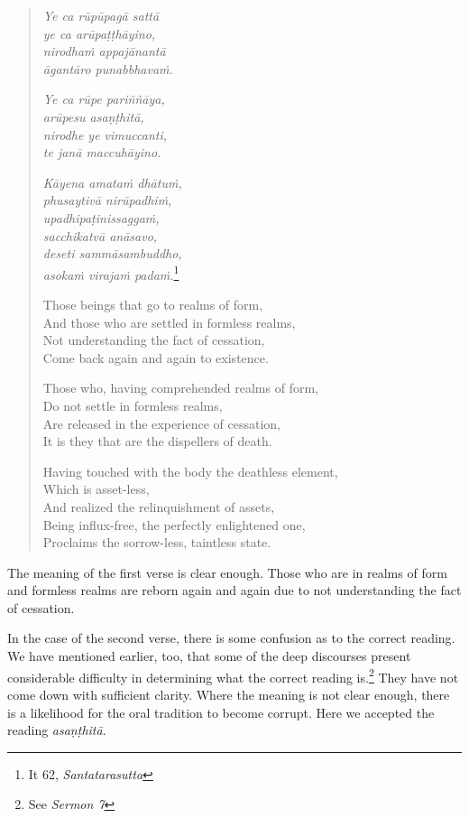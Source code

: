 \begin{quote}
\emph{Ye ca rūpūpagā sattā}\\
\emph{ye ca arūpaṭṭhāyino,}\\
\emph{nirodhaṁ appajānantā}\\
\emph{āgantāro punabbhavaṁ.}

\emph{Ye ca rūpe pariññāya,}\\
\emph{arūpesu asaṇṭhitā,}\\
\emph{nirodhe ye vimuccanti,}\\
\emph{te janā maccuhāyino.}

\emph{Kāyena amataṁ dhātuṁ,}\\
\emph{phusaytivā nirūpadhiṁ,}\\
\emph{upadhipaṭinissaggaṁ,}\\
\emph{sacchikatvā anāsavo,}\\
\emph{deseti sammāsambuddho,}\\
\emph{asokaṁ virajaṁ padaṁ.}\footnote{It 62, \emph{Santatarasutta}}

Those beings that go to realms of form,\\
And those who are settled in formless realms,\\
Not understanding the fact of cessation,\\
Come back again and again to existence.

Those who, having comprehended realms of form,\\
Do not settle in formless realms,\\
Are released in the experience of cessation,\\
It is they that are the dispellers of death.

Having touched with the body the deathless element,\\
Which is asset-less,\\
And realized the relinquishment of assets,\\
Being influx-free, the perfectly enlightened one,\\
Proclaims the sorrow-less, taintless state.
\end{quote}

The meaning of the first verse is clear enough. Those who are in realms of form and formless realms are reborn again and again due to not understanding the fact of cessation.

In the case of the second verse, there is some confusion as to the correct reading. We have mentioned earlier, too, that some of the deep discourses present considerable difficulty in determining what the correct reading is.\footnote{See \emph{Sermon 7}} They have not come down with sufficient clarity. Where the meaning is not clear enough, there is a likelihood for the oral tradition to become corrupt. Here we accepted the reading \emph{asaṇṭhitā}.

